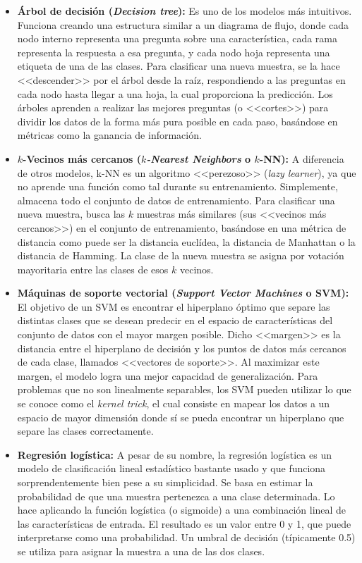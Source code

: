 \begin{itemize}
	\item \textbf{Árbol de decisión (\textit{Decision tree}):} Es uno de los modelos más intuitivos. Funciona creando una estructura similar a un diagrama de flujo, donde cada nodo interno representa una pregunta sobre una característica, cada rama representa la respuesta a esa pregunta, y cada nodo hoja representa una etiqueta de una de las clases. Para clasificar una nueva muestra, se la hace <<descender>> por el árbol desde la raíz, respondiendo a las preguntas en cada nodo hasta llegar a una hoja, la cual proporciona la predicción. Los árboles aprenden a realizar las mejores preguntas (o <<cortes>>) para dividir los datos de la forma más pura posible en cada paso, basándose en métricas como la ganancia de información.~\cite{breiman2017classification}
	
	\item \textbf{$k$-Vecinos más cercanos (\textit{$k$-Nearest Neighbors} o $k$-NN):} A diferencia de otros modelos, k-NN es un algoritmo <<perezoso>> (\textit{lazy learner}), ya que no aprende una función como tal durante su entrenamiento. Simplemente, almacena todo el conjunto de datos de entrenamiento. Para clasificar una nueva muestra, busca las $k$ muestras más similares (sus <<vecinos más cercanos>>) en el conjunto de entrenamiento, basándose en una métrica de distancia como puede ser la distancia euclídea, la distancia de Manhattan o la distancia de Hamming. La clase de la nueva muestra se asigna por votación mayoritaria entre las clases de esos $k$ vecinos.~\cite{cover1967nearest}
	
	\item \textbf{Máquinas de soporte vectorial (\textit{Support Vector Machines} o SVM):} El objetivo de un SVM es encontrar el hiperplano óptimo que separe las distintas clases que se desean predecir en el espacio de características del conjunto de datos con el mayor margen posible. Dicho <<margen>> es la distancia entre el hiperplano de decisión y los puntos de datos más cercanos de cada clase, llamados <<vectores de soporte>>. Al maximizar este margen, el modelo logra una mejor capacidad de generalización. Para problemas que no son linealmente separables, los SVM pueden utilizar lo que se conoce como el \textit{kernel trick}, el cual consiste en mapear los datos a un espacio de mayor dimensión donde sí se pueda encontrar un hiperplano que separe las clases correctamente.~\cite{cortes1995support}

	\item \textbf{Regresión logística:} A pesar de su nombre, la regresión logística es un modelo de clasificación lineal estadístico bastante usado y que funciona sorprendentemente bien pese a su simplicidad. Se basa en estimar la probabilidad de que una muestra pertenezca a una clase determinada. Lo hace aplicando la función logística (o sigmoide) a una combinación lineal de las características de entrada. El resultado es un valor entre 0 y 1, que puede interpretarse como una probabilidad. Un umbral de decisión (típicamente 0.5) se utiliza para asignar la muestra a una de las dos clases.
\end{itemize}

